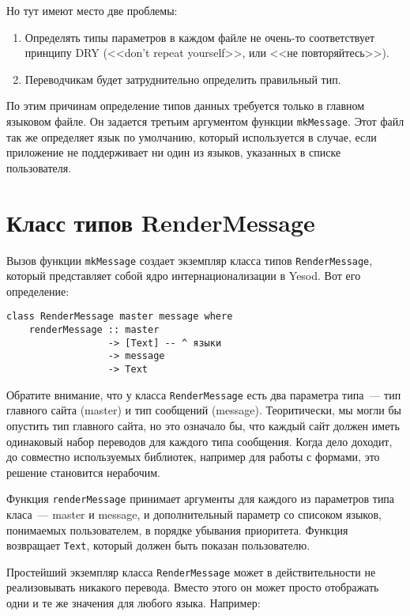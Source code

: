Но тут имеют место две проблемы:

\begin{enumerate}
  \item Определять типы параметров в каждом файле не очень-то соответствует
      принципу DRY (<<don't repeat yourself>>, или <<не повторяйтесь>>).

  \item Переводчикам будет затруднительно определить правильный тип.
\end{enumerate}

По этим причинам определение типов данных требуется только в главном языковом
файле. Он задается третьим аргументом функции \lstinline'mkMessage'. Этот файл
так же определяет язык по умолчанию, который используется в случае, если
приложение не поддерживает ни один из языков, указанных в списке пользователя.

\section{Класс типов RenderMessage} %

Вызов функции \lstinline'mkMessage' создает экземпляр класса типов
\lstinline'RenderMessage', который представляет собой ядро интернационализации
в Yesod. Вот его определение:

\begin{lstlisting}
class RenderMessage master message where
    renderMessage :: master
                  -> [Text] -- ^ языки
                  -> message
                  -> Text 
\end{lstlisting}

Обратите внимание, что у класса \lstinline'RenderMessage' есть два параметра
типа~--- тип главного сайта (master) и тип сообщений (message). Теоритически,
мы могли бы опустить тип главного сайта, но это означало бы, что каждый сайт
должен иметь одинаковый набор переводов для каждого типа сообщения. Когда дело
доходит, до совместно используемых библиотек, например для работы с формами,
это решение становится нерабочим.

Функция \lstinline'renderMessage' принимает аргументы для каждого из параметров
типа класа~--- master и message, и дополнительный параметр со списоком языков,
понимаемых пользователем, в порядке убывания приоритета. Функция возвращает
\lstinline'Text', который должен быть показан пользователю.

Простейший экземпляр класса \lstinline'RenderMessage' может в действительности
не реализовывать никакого перевода. Вместо этого он может просто отображать
одни и те же значения для любого языка. Например:

